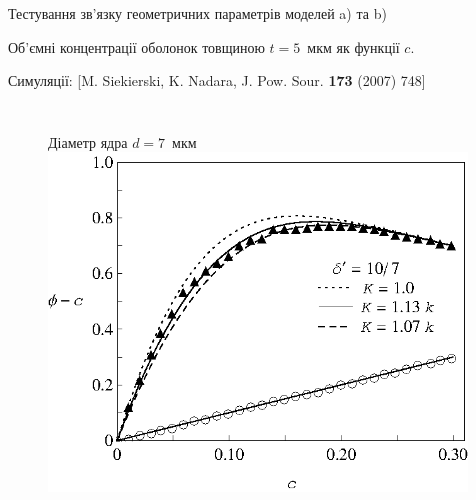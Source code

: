 \documentclass[10pt]{beamer}
\begin{document}
\begin{frame}{Тестування зв'язку геометричних параметрів моделей a) та b)}

{ Об'ємні концентрації оболонок товщиною $t=5$~мкм як функції $c$.}
\vspace{-5pt}

\scriptsize{Симуляції: [M. Siekierski, K. Nadara, J. Pow. Sour. {\bf 173} (2007) 748]}
\vspace{-5pt}

\footnotesize
\begin{columns}[T,onlytextwidth]
      \begin{figure}
        \centering
        \qquad Діаметр ядра $d=7$~мкм
        \includegraphics[width=0.99\textwidth]{images/Fig2_SiekierskiShell_107.eps}
      \end{figure}


\end{columns}
\end{frame}
\end{document}
